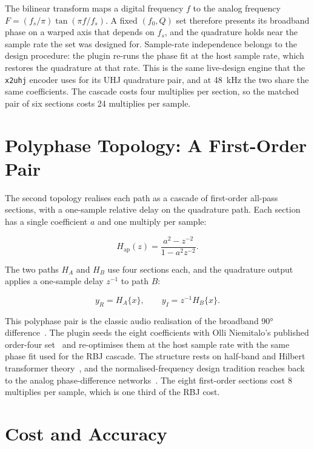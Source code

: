 \documentclass[11pt,a4paper]{article}
\begin{document}
The bilinear transform maps a digital frequency $f$ to the analog frequency $F = (f_s/\pi)\tan(\pi f / f_s)$.
A fixed $(f_0, Q)$ set therefore presents its broadband phase on a warped axis that depends on $f_s$, and the quadrature holds near the sample rate the set was designed for.
Sample-rate independence belongs to the design procedure: the plugin re-runs the phase fit at the host sample rate, which restores the quadrature at that rate.
This is the same live-design engine that the \texttt{x2uhj} encoder uses for its UHJ quadrature pair, and at \SI{48}{\kilo\hertz} the two share the same coefficients.
The cascade costs four multiplies per section, so the matched pair of six sections costs \num{24} multiplies per sample.

\section{Polyphase Topology: A First-Order Pair}

The second topology realises each path as a cascade of first-order all-pass sections, with a one-sample relative delay on the quadrature path.
Each section has a single coefficient $a$ and one multiply per sample:

\begin{equation}
H_\text{ap}(z) = \frac{a^2 - z^{-2}}{1 - a^2 z^{-2}} .
\end{equation}

The two paths $H_A$ and $H_B$ use four sections each, and the quadrature output applies a one-sample delay $z^{-1}$ to path $B$:

\begin{equation}
y_R = H_A\{x\}, \qquad y_I = z^{-1} H_B\{x\} .
\end{equation}

This polyphase pair is the classic audio realisation of the broadband \ang{90} difference~\cite{Ansari1987Hilbert,RegaliaMitraVaidyanathan1988,Niemitalo2003}.
The plugin seeds the eight coefficients with Olli Niemitalo's published order-four set~\cite{Niemitalo2003} and re-optimises them at the host sample rate with the same phase fit used for the RBJ cascade.
The structure rests on half-band and Hilbert transformer theory~\cite{SchusslerSteffen1998}, and the normalised-frequency design tradition reaches back to the analog phase-difference networks~\cite{Bedrosian1960}.
The eight first-order sections cost \num{8} multiplies per sample, which is one third of the RBJ cost.

\section{Cost and Accuracy}
\end{document}
